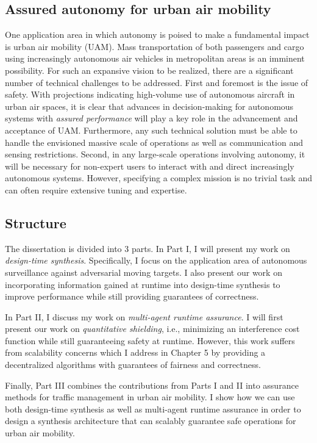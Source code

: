 \subsection{Assured autonomy for urban air mobility} One application area in which autonomy is poised to make a fundamental impact is urban air mobility (UAM). Mass transportation of both passengers and cargo using increasingly autonomous air vehicles in metropolitan areas is an imminent possibility. For such an expansive vision to be realized, there are a significant number of technical challenges to be addressed.  First and foremost is the issue of safety. With projections indicating high-volume use of autonomous aircraft in urban air spaces, it is clear that advances in decision-making for autonomous systems with \emph{assured performance} will play a key role in the advancement and acceptance of UAM. Furthermore, any such technical solution must be able to handle the envisioned massive scale of operations as well as communication and sensing restrictions. Second, in any large-scale operations involving autonomy, it will be necessary for non-expert users to interact with and direct increasingly autonomous systems. However, specifying a complex mission is no trivial task and can often require extensive tuning and expertise. 


\subsection{Structure}

The dissertation is divided into 3 parts. In Part I, I will present my work on \emph{design-time synthesis}. Specifically, I focus on the application area of autonomous surveillance against adversarial moving targets. I also present our work on incorporating information gained at runtime into design-time synthesis to improve performance while still providing guarantees of correctness. 

In Part II, I discuss my work on \emph{multi-agent runtime assurance}. I will first present our work on \emph{quantitative shielding}, i.e., minimizing an interference cost function while still guaranteeing safety at runtime. However, this work suffers from scalability concerns which I address in Chapter 5 by providing a decentralized algorithms with guarantees of fairness and correctness.

Finally, Part III combines the contributions from Parts I and II into assurance methods for traffic management in urban air mobility. I show how we can use both design-time synthesis as well as multi-agent runtime assurance in order to design a synthesis architecture that can scalably guarantee safe operations for urban air mobility. 


